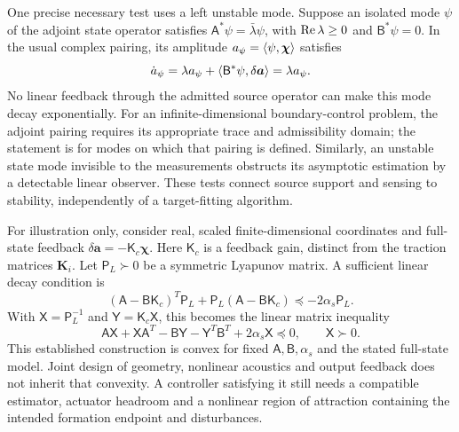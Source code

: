 One precise necessary test uses a left unstable mode. Suppose an isolated
mode $\psi$ of the adjoint state operator satisfies
$\mathsf A^*\psi=\bar\lambda\psi$, with $\operatorname{Re}\lambda\geq0$ and
$\mathsf B^*\psi=0$. In the usual complex pairing, its amplitude
$a_\psi=\left\langle\psi,\bm\chi\right\rangle$ satisfies
\begin{equation}
 \dot a_\psi=\lambda a_\psi
       +\left\langle\mathsf B^*\psi,\delta\bm a\right\rangle
       =\lambda a_\psi.
 \label{eq:uncontrollable-mode}
\end{equation}
No linear feedback through the admitted source operator can make this mode
decay exponentially. For an infinite-dimensional boundary-control problem,
the adjoint pairing requires its appropriate trace and admissibility domain;
the statement is for modes on which that pairing is defined. Similarly, an
unstable state mode invisible to the measurements obstructs its asymptotic
estimation by a detectable linear observer. These tests connect source support
and sensing to stability, independently of a target-fitting algorithm.

For illustration only, consider real, scaled finite-dimensional coordinates
and full-state feedback $\delta\bm a=-\mathsf K_c\bm\chi$. Here
$\mathsf K_c$ is a feedback gain, distinct from the traction matrices
$\bm K_i$. Let $\mathsf P_L\succ0$ be a symmetric Lyapunov matrix. A
sufficient linear decay condition is
\begin{equation}
 (\mathsf A-\mathsf B\mathsf K_c)^T\mathsf P_L
 +\mathsf P_L(\mathsf A-\mathsf B\mathsf K_c)
 \preceq-2\alpha_s\mathsf P_L.
 \label{eq:lyapunov}
\end{equation}
With $\mathsf X=\mathsf P_L^{-1}$ and $\mathsf Y=\mathsf K_c\mathsf X$, this
becomes the linear matrix inequality
\begin{equation}
 \mathsf A\mathsf X+\mathsf X\mathsf A^T
 -\mathsf B\mathsf Y-\mathsf Y^T\mathsf B^T
       +2\alpha_s\mathsf X\preceq0,\qquad\mathsf X\succ0.
 \label{eq:feedback-lmi}
\end{equation}
This established construction \cite{boyd1994} is convex for fixed
$\mathsf A,\mathsf B,\alpha_s$ and the stated full-state model. Joint design
of geometry, nonlinear acoustics and output feedback does not inherit that
convexity. A controller satisfying it still needs a compatible estimator,
actuator headroom and a nonlinear region of attraction containing the intended
formation endpoint and disturbances.

